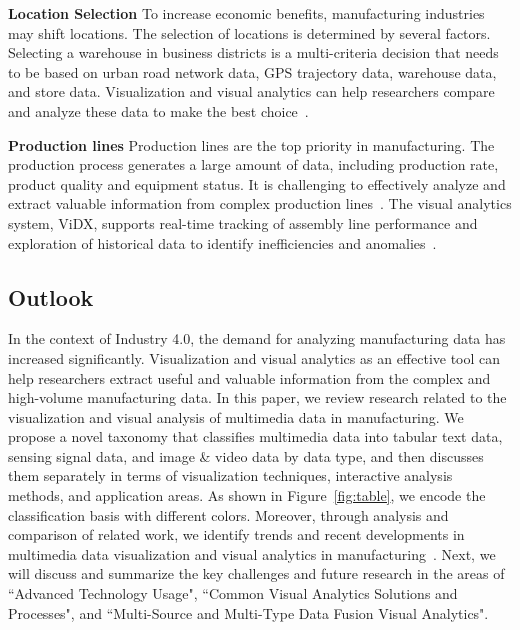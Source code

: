\documentclass[a4paper,fleqn]{cas-dc}
\begin{document}
\textbf{Location Selection} To increase economic benefits, manufacturing industries may shift locations. The selection of locations is determined by several factors. Selecting a warehouse in business districts is a multi-criteria decision that needs to be based on urban road network data, GPS
trajectory data, warehouse data, and store data. Visualization and visual analytics can help researchers compare and analyze these data to make the best choice~\cite{Li2020}.

\textbf{Production lines} Production lines are the top priority in manufacturing. The production process generates a large amount of data, including production rate, product quality and equipment status. It is challenging to effectively analyze and extract valuable information from complex production lines~\cite{wu2018visual}. The visual analytics system, ViDX, supports real-time tracking of assembly line performance and exploration of historical data to identify inefficiencies and anomalies~\cite{xu2016vidx}.

\subsection{Outlook}
In the context of Industry 4.0, the demand for analyzing manufacturing data has increased significantly. Visualization and visual analytics as an effective tool can help researchers extract useful and valuable information from the complex and high-volume manufacturing data. 
In this paper, we review research related to the visualization and visual analysis of multimedia data in manufacturing.
We propose a novel taxonomy that classifies multimedia data into tabular text data, sensing signal data, and image \& video data by data type, and then discusses them separately in terms of visualization techniques, interactive analysis methods, and application areas. As shown in Figure~\ref{fig:table}, we encode the classification basis with different colors.
Moreover, through analysis and comparison of related work, we identify trends and recent developments in multimedia data visualization and visual analytics in manufacturing~\cite{Gehlot2022}.
Next, we will discuss and summarize the key challenges and future research in the areas of ``Advanced Technology Usage", ``Common Visual Analytics Solutions and Processes", and ``Multi-Source and Multi-Type Data Fusion Visual Analytics".
\end{document}
